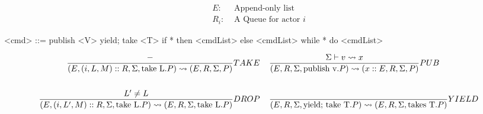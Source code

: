 \documentclass[acmsmall,review,anonymous]{acmart}\settopmatter{printfolios=true}
\begin{document}
\begin{comment}
\begin{align*}
\judge{&Receive}{
	-
}{
	\semfunc[\text{match (i, Msg) Cs end}, (i', Msg')] = \semfunc[\text{Cs[i/i', Msg/Msg']}]  %
}\\
\\
\judge{&Yield}{
	-
}{
	\semfunc[\text{yield ev; p}] = (p, ev)  %
}\\
\\
\judge{&ParallelLeft\text{ and symmetrically for p2}}{  %
	\semfunc[p1, (i, Msg)] = (p1', ev)
}{
	\semfunc[\text{par p1 and p2 end}, (i, Msg)] = (\text{par p1' and p2 end}, ev)
}\\
\\
\judge{&ParallelDone}{
    -
}{
	\semfunc[\text{par done and done end}] = (done, ev)
}
\end{align*}
\begin{align*}
\judge{&Then}{
	-
}{
	\semfunc[\text{if * then C1 else C2}] = \semfunc[C1]
}& \;\;\;\;
\judge{&CaseGo}{
	- %
}{
	\semfunc[\text{(i, *) => p; Cs}] = \semfunc[p]
}\\
\\
\judge{&Else}{
	-
}{
	\semfunc[\text{if * then C1 else C2}] = \semfunc[C2]
}& \;\;\;\;
\judge{&CaseDrop}{
	-
}{
	\semfunc[\text{(i, *) => p; Cs}] = \semfunc[Cs]
}\\
\\
\judge{&WhileDone}{
	-
}{
	\semfunc[\text{while * do p end; p'}] = \semfunc[p']
}& \;\;\;\;
\judge{&While}{
	\semfunc[p] = (p', ev)
}{
	\semfunc[\text{while * do p end}] = (\text{p'; while * do p end}, ev)
}
\end{align*}

\end{comment}
\vfill
\pagebreak




\begin{align*}
	E :& \text{ Append-only list} \\
    R_i :& \text{ A Queue for actor } i
\end{align*}

\begin{grammar}
	<cmd> ::= publish <V>
         \alt yield; take <T>
         \alt if * then <cmdList> else <cmdList>
         \alt while * do <cmdList>
\end{grammar}


\begin{align*}
\judge{TAKE}{
	-
}{
	(E, (i, L, M)::R, \Sigma, \text{take L}.P) \reduce (E, R, \Sigma, P)
}& \;\;\;\;
\judge{PUB}{
	\Sigma \vdash v \reduce x
}{
	(E, R, \Sigma, \text{publish v}.P)\reduce (x::E, R, \Sigma, P)
}\\
\\
\judge{DROP}{
	L' \neq L
}{
	(E, (i, L', M)::R, \Sigma, \text{take L}.P) \reduce (E, R, \Sigma, \text{take L}.P)
} & \;\;\;\;
\judge{YIELD}{
	 \;
}{
	(E, R, \Sigma, \text{yield; take T}.P) \reduce (E, R, \Sigma, \text{takes T}.P)
}
\end{align*}
\end{document}
